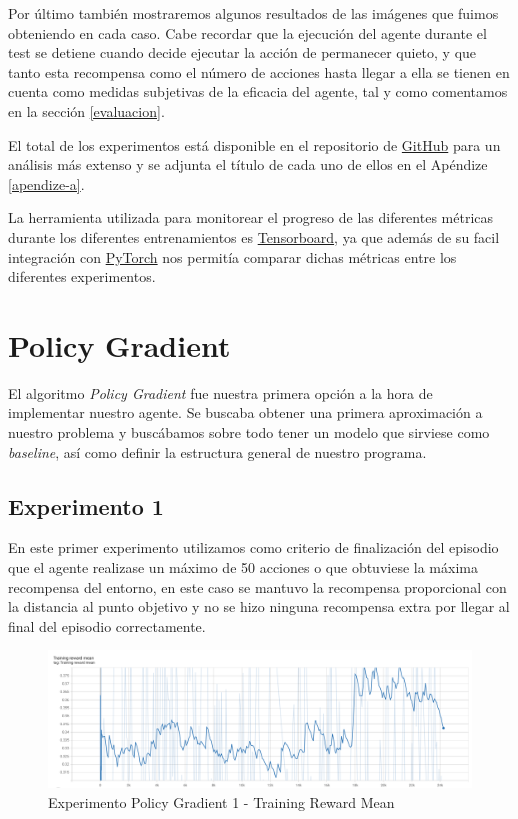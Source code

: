 Por último también mostraremos algunos resultados de las imágenes que fuimos obteniendo en cada caso. Cabe recordar que la ejecución del agente durante el test se detiene cuando decide ejecutar la acción de permanecer quieto, y que tanto esta recompensa como el número de acciones hasta llegar a ella se tienen en cuenta como medidas subjetivas de la eficacia del agente, tal y como comentamos en la sección \ref{evaluacion}.
\medskip

El total de los experimentos está disponible en el repositorio de \href{https://github.com/lucaswerner90/msc-degree-ai}{GitHub} para un análisis más extenso y se adjunta el título de cada uno de ellos en el Apéndize \ref{apendize-a}. 
\medskip

La herramienta utilizada para monitorear el progreso de las diferentes métricas durante los diferentes entrenamientos es \href{https://www.tensorflow.org/tensorboard?hl=es-419}{Tensorboard}, ya que además de su facil integración con \href{https://pytorch.org/}{PyTorch} nos permitía comparar dichas métricas entre los diferentes experimentos.
\medskip

\section{Policy Gradient}
\label{resultados-policy-gradient}

El algoritmo \textit{Policy Gradient} fue nuestra primera opción a la hora de implementar nuestro agente. Se buscaba obtener una primera aproximación a nuestro problema y buscábamos sobre todo tener un modelo que sirviese como \textit{baseline}, así como definir la estructura general de nuestro programa.
\medskip

\subsection{Experimento 1}
\label{resultados-policy-gradient-experimento-1}

En este primer experimento utilizamos como criterio de finalización del episodio que el agente realizase un máximo de 50 acciones o que obtuviese la máxima recompensa del entorno, en este caso se mantuvo la recompensa proporcional con la distancia al punto objetivo y no se hizo ninguna recompensa extra por llegar al final del episodio correctamente.
\medskip

\begin{figure}[H]
	\centering
	\includegraphics[width=1\textwidth]{figuras/experiments/policy_gradient/policy_gradient_normalized_image_reward_20_epochs/training_reward_mean.png}
	\caption[Experimento Policy Gradient 1 - Training Reward Mean]{Experimento Policy Gradient 1 - Training Reward Mean}
	\label{fig-experimento-policy-gradient-1-training-reward-mean}
\end{figure}

